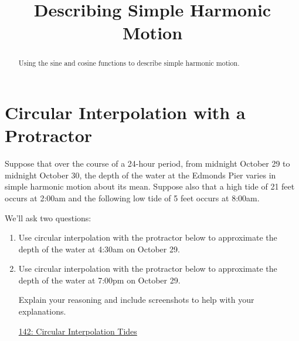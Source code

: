 \documentclass{ximera}
\title{Describing Simple Harmonic Motion}
\begin{document}
\begin{abstract}
Using the sine and cosine functions to describe simple harmonic motion.
\end{abstract}
\maketitle



\section{Circular Interpolation with a Protractor}

\begin{example}  \label{E8bdsdsf}
Suppose that over the course of a 24-hour period, from midnight October 29 to midnight October 30, the depth of the water at the Edmonds Pier varies in simple harmonic motion about its mean. Suppose also that a high tide of 21 feet occurs at 2:00am and the following low tide of 5 feet occurs at 8:00am. 

We'll ask two questions:

\begin{enumerate}
\item Use circular interpolation with the protractor below to approximate the depth of the water at 4:30am on October 29.

\item Use circular interpolation with the protractor below to approximate the depth of the water at 7:00pm on October 29.


Explain your reasoning and include screenshots to help with your explanations. 
\begin{freeResponse}
\end{freeResponse}

\begin{onlineOnly}
    \begin{center}
\end{center}
\end{onlineOnly}

\href{https://www.desmos.com/calculator/0wxwmkzvky}{142: Circular Interpolation Tides}


\end{enumerate}
\end{example}
\end{document}
